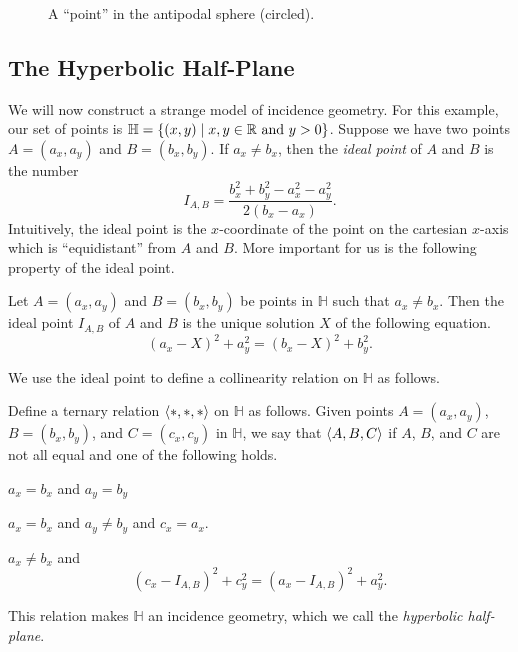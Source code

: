\begin{figure}
\begin{center}
\caption{\label{fig:antipodal-sphere-point}A ``point'' in the antipodal sphere (circled).}
\end{center}
\end{figure}



\subsection{The Hyperbolic Half-Plane}

We will now construct a strange model of incidence geometry.
For this example, our set of points is \(\mathbb{H} = \{ (x,y) \mid x,y \in \mathbb{R}\ \mathrm{and}\ y > 0 \}\).
Suppose we have two points \(A = (a_x, a_y)\) and \(B = (b_x, b_y)\).
If \(a_x \neq b_x\), then the \emph{ideal point} of \(A\) and \(B\) is the number \[ I_{A,B} = \frac{b_x^2 + b_y^2 - a_x^2 - a_y^2}{2(b_x - a_x)}. \]
Intuitively, the ideal point is the \(x\)-coordinate of the point on the cartesian \(x\)-axis which is ``equidistant'' from \(A\) and \(B\).
More important for us is the following property of the ideal point.

\begin{lem}
Let \(A = (a_x, a_y)\) and \(B = (b_x, b_y)\) be points in \(\mathbb{H}\) such that \(a_x \neq b_x\).
Then the ideal point \(I_{A,B}\) of \(A\) and \(B\) is the unique solution \(X\) of the following equation.
\[ (a_x - X)^2 + a_y^2 = (b_x - X)^2 + b_y^2. \]
\end{lem}

We use the ideal point to define a collinearity relation on \(\mathbb{H}\) as follows.

\begin{prop}\label{prop:hyp-half-plane}
Define a ternary relation \(\langle \ast, \ast, \ast \rangle\) on \(\mathbb{H}\) as follows.
Given points \(A = (a_x, a_y)\), \(B = (b_x, b_y)\), and \(C = (c_x, c_y)\) in \(\mathbb{H}\), we say that \(\langle A, B, C \rangle\) if \(A\), \(B\), and \(C\) are not all equal and one of the following holds.
\begin{proplist}
\item \(a_x = b_x\) and \(a_y = b_y\)
\item \(a_x = b_x\) and \(a_y \neq b_y\) and \(c_x = a_x\).
\item \(a_x \neq b_x\) and \[ (c_x - I_{A,B})^2 + c_y^2 = (a_x - I_{A,B})^2 + a_y^2. \]
\end{proplist}
This relation makes \(\mathbb{H}\) an incidence geometry, which we call the \emph{hyperbolic half-plane}.
\end{prop}

